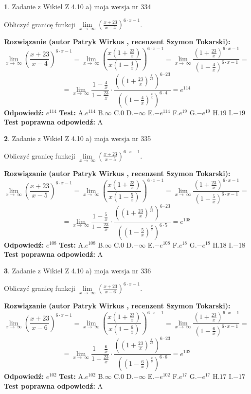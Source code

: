 \documentclass[12pt, a4paper]{article}
\theoremstyle{definition} %
\newtheorem{zad}{}
\newcommand{\zadStart}[1]{\begin{zad}#1\newline}
\newcommand{\zadStop}{\end{zad}}
\newcommand{\rozwStart}[2]{\noindent \textbf{Rozwiązanie (autor #1 , recenzent #2): }\newline}
\newcommand{\rozwStop}{\newline}
\newcommand{\odpStart}{\noindent \textbf{Odpowiedź:}\newline}
\newcommand{\odpStop}{\newline}
\newcommand{\testStart}{\noindent \textbf{Test:}\newline}
\newcommand{\testStop}{\newline}
\newcommand{\kluczStart}{\noindent \textbf{Test poprawna odpowiedź:}\newline}
\newcommand{\kluczStop}{\newline}
\begin{document}
\zadStart{Zadanie z Wikieł Z 4.10 a) moja wersja nr 334}

Obliczyć granicę funkcji  $\lim\limits_{x\to\ \infty}(\frac{x+23}{x-4})^{6\cdot x-1}$.
\zadStop
\rozwStart{Patryk Wirkus}{Szymon Tokarski}
$$\lim\limits_{x\to\ \infty}(\frac{x+23}{x-4})^{6\cdot x-1} = \lim\limits_{x\to\ \infty}(\frac{x(1+\frac{23}{x})}{x(1-\frac{4}{x})})^{6\cdot x-1}=\lim\limits_{x\to\ \infty}\frac{(1+\frac{23}{x})^{6\cdot x-1}}{(1-\frac{4}{x})^{6\cdot x-1}}=$$
$$=\lim\limits_{x\to\ \infty}\frac{1-\frac{4}{x}}{1+\frac{23}{x}}\cdot\frac{((1+\frac{23}{x})^{\frac{x}{23}})^{6\cdot23}}{((1-\frac{4}{x})^{\frac{x}{4}})^{6\cdot4}}=e^{114}$$
\rozwStop
\odpStart
$e^{114}$
\odpStop
\testStart
A.$e^{114}$ B.$\infty$ C.$0$ D.$-\infty$ E.$-e^{114}$
F.$e^{19}$ G.$-e^{19}$
H.$19$
I.$-19$
\testStop
\kluczStart
A
\kluczStop



\zadStart{Zadanie z Wikieł Z 4.10 a) moja wersja nr 335}

Obliczyć granicę funkcji  $\lim\limits_{x\to\ \infty}(\frac{x+23}{x-5})^{6\cdot x-1}$.
\zadStop
\rozwStart{Patryk Wirkus}{Szymon Tokarski}
$$\lim\limits_{x\to\ \infty}(\frac{x+23}{x-5})^{6\cdot x-1} = \lim\limits_{x\to\ \infty}(\frac{x(1+\frac{23}{x})}{x(1-\frac{5}{x})})^{6\cdot x-1}=\lim\limits_{x\to\ \infty}\frac{(1+\frac{23}{x})^{6\cdot x-1}}{(1-\frac{5}{x})^{6\cdot x-1}}=$$
$$=\lim\limits_{x\to\ \infty}\frac{1-\frac{5}{x}}{1+\frac{23}{x}}\cdot\frac{((1+\frac{23}{x})^{\frac{x}{23}})^{6\cdot23}}{((1-\frac{5}{x})^{\frac{x}{5}})^{6\cdot5}}=e^{108}$$
\rozwStop
\odpStart
$e^{108}$
\odpStop
\testStart
A.$e^{108}$ B.$\infty$ C.$0$ D.$-\infty$ E.$-e^{108}$
F.$e^{18}$ G.$-e^{18}$
H.$18$
I.$-18$
\testStop
\kluczStart
A
\kluczStop



\zadStart{Zadanie z Wikieł Z 4.10 a) moja wersja nr 336}

Obliczyć granicę funkcji  $\lim\limits_{x\to\ \infty}(\frac{x+23}{x-6})^{6\cdot x-1}$.
\zadStop
\rozwStart{Patryk Wirkus}{Szymon Tokarski}
$$\lim\limits_{x\to\ \infty}(\frac{x+23}{x-6})^{6\cdot x-1} = \lim\limits_{x\to\ \infty}(\frac{x(1+\frac{23}{x})}{x(1-\frac{6}{x})})^{6\cdot x-1}=\lim\limits_{x\to\ \infty}\frac{(1+\frac{23}{x})^{6\cdot x-1}}{(1-\frac{6}{x})^{6\cdot x-1}}=$$
$$=\lim\limits_{x\to\ \infty}\frac{1-\frac{6}{x}}{1+\frac{23}{x}}\cdot\frac{((1+\frac{23}{x})^{\frac{x}{23}})^{6\cdot23}}{((1-\frac{6}{x})^{\frac{x}{6}})^{6\cdot6}}=e^{102}$$
\rozwStop
\odpStart
$e^{102}$
\odpStop
\testStart
A.$e^{102}$ B.$\infty$ C.$0$ D.$-\infty$ E.$-e^{102}$
F.$e^{17}$ G.$-e^{17}$
H.$17$
I.$-17$
\testStop
\kluczStart
A
\kluczStop
\end{document}
